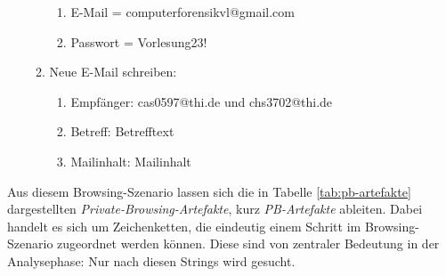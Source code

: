 \begin{enumerate}
\begin{enumerate}[label*=\arabic*.]
\begin{enumerate}[label*=\arabic*.]
			\item E-Mail = \glqq{}computerforensikvl@gmail.com\grqq{}
			\item Passwort = \glqq{}Vorlesung23!\grqq{}
			\end{enumerate}
	\item Neue E-Mail schreiben:
			\begin{enumerate}[label*=\arabic*.]
			\item Empfänger: \glqq{}cas0597@thi.de\grqq{} und \glqq{}chs3702@thi.de\grqq{}
			\item Betreff: \glqq{}Betrefftext\grqq{}
			\item Mailinhalt: \glqq{}Mailinhalt\grqq{}
			\end{enumerate}			
	\end{enumerate}
\end{enumerate}

Aus diesem Browsing-Szenario lassen sich die in Tabelle \ref{tab:pb-artefakte} dargestellten \textit{Private-Browsing-Artefakte}, kurz \textit{PB-Artefakte} ableiten. Dabei handelt es sich um Zeichenketten, die eindeutig einem Schritt im Browsing-Szenario zugeordnet werden können. Diese sind von zentraler Bedeutung in der Analysephase: Nur nach diesen Strings wird gesucht.

